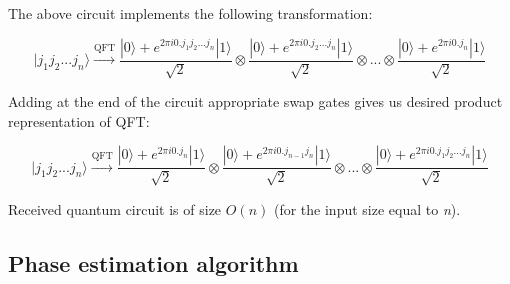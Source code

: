 \newpage
{}

\[ \]

The above circuit implements the following transformation:

\[ |j_1 j_2 ... j_n\rangle \xrightarrow{\text{QFT}} \frac{|0\rangle + e^{2 \pi i 0.j_1 j_2 ... j_n}|1\rangle}{\sqrt{2}} \otimes \frac{|0\rangle + e^{2 \pi i 0.j_2 ... j_n}|1\rangle}{\sqrt{2}} \otimes ... \otimes  \frac{|0\rangle + e^{2 \pi i 0.j_n}|1\rangle}{\sqrt{2}}\]

Adding at the end of the circuit appropriate swap gates gives us desired product representation of QFT:

\[ |j_1 j_2 ... j_n\rangle \xrightarrow{\text{QFT}} \frac{|0\rangle + e^{2 \pi i 0.j_n}|1\rangle}{\sqrt{2}} \otimes \frac{|0\rangle + e^{2 \pi i 0.j_{n - 1} j_n}|1\rangle}{\sqrt{2}} \otimes ... \otimes \frac{|0\rangle + e^{2 \pi i 0.j_1 j_2 ... j_n}|1\rangle}{\sqrt{2}} \]

Received quantum circuit is of size $O(n)$ (for the input size equal to \textit{n}).


\subsection{Phase estimation algorithm} \label{phase_estimation}

